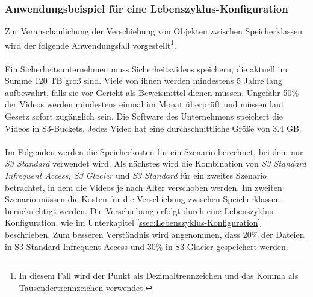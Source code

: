 \subsubsection{Anwendungsbeispiel für eine Lebenszyklus-Konfiguration}\label{Anwendungsbeispiel-Leben-Konfig}
Zur Veranschaulichung der Verschiebung von Objekten zwischen Speicherklassen wird der folgende Anwendungsfall vorgestellt\footnote{In diesem Fall wird der Punkt als Dezimaltrennzeichen und das Komma als Tausendertrennzeichen verwendet.}. 
\\\\
Ein Sicherheitsunternehmen muss Sicherheitsvideos speichern, die aktuell im Summe 120 TB groß sind. Viele von ihnen werden mindestens 5 Jahre lang aufbewahrt, falls sie vor Gericht als Beweismittel dienen müssen. Ungefähr 50\% der Videos werden mindestens einmal im Monat überprüft und müssen laut Gesetz sofort zugänglich sein. Die Software des Unternehmens speichert die Videos in S3-Buckets. Jedes Video hat eine durchschnittliche Größe von 3.4 GB.
\\\\
Im Folgenden werden die Speicherkosten für ein Szenario berechnet, bei dem nur \textit{S3 Standard} verwendet wird. Als nächstes wird die Kombination von \textit{S3 Standard Infrequent Access, S3 Glacier} und \textit{S3 Standard} für ein zweites Szenario betrachtet, in dem die Videos je nach Alter verschoben werden. Im zweiten Szenario müssen die Kosten für die Verschiebung zwischen Speicherklassen berücksichtigt werden. Die Verschiebung erfolgt durch eine Lebenszyklus-Konfiguration, wie im Unterkapitel \ref{ssec:Lebenszyklus-Konfiguration} beschrieben. Zum besseren Verständnis wird angenommen, dass 20\% der Dateien in S3 Standard Infrequent Access und 30\% in S3 Glacier gespeichert werden.
\newpage

